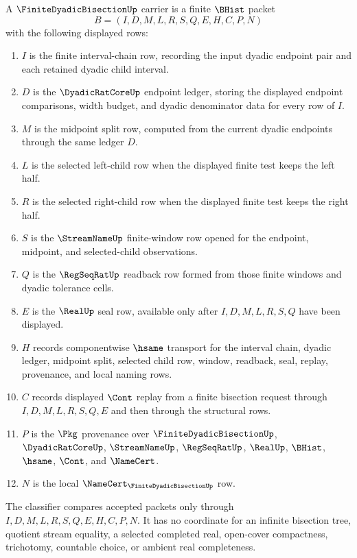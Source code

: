 \begin{definition}
\label{def:finite-dyadic-bisection-carrier}
A $\FiniteDyadicBisectionUp$ carrier is a finite $\BHist$ packet
$$
B=(I,D,M,L,R,S,Q,E,H,C,P,N)
$$
with the following displayed rows:
\begin{enumerate}
\item $I$ is the finite interval-chain row, recording the input dyadic endpoint pair and each retained dyadic child interval.
\item $D$ is the $\DyadicRatCoreUp$ endpoint ledger, storing the displayed endpoint comparisons, width budget, and dyadic denominator data for every row of $I$.
\item $M$ is the midpoint split row, computed from the current dyadic endpoints through the same ledger $D$.
\item $L$ is the selected left-child row when the displayed finite test keeps the left half.
\item $R$ is the selected right-child row when the displayed finite test keeps the right half.
\item $S$ is the $\StreamNameUp$ finite-window row opened for the endpoint, midpoint, and selected-child observations.
\item $Q$ is the $\RegSeqRatUp$ readback row formed from those finite windows and dyadic tolerance cells.
\item $E$ is the $\RealUp$ seal row, available only after $I,D,M,L,R,S,Q$ have been displayed.
\item $H$ records componentwise $\hsame$ transport for the interval chain, dyadic ledger, midpoint split, selected child row, window, readback, seal, replay, provenance, and local naming rows.
\item $C$ records displayed $\Cont$ replay from a finite bisection request through $I,D,M,L,R,S,Q,E$ and then through the structural rows.
\item $P$ is the $\Pkg$ provenance over $\FiniteDyadicBisectionUp$, $\DyadicRatCoreUp$, $\StreamNameUp$, $\RegSeqRatUp$, $\RealUp$, $\BHist$, $\hsame$, $\Cont$, and $\NameCert$.
\item $N$ is the local $\NameCert_{\FiniteDyadicBisectionUp}$ row.
\end{enumerate}
The classifier compares accepted packets only through $I,D,M,L,R,S,Q,E,H,C,P,N$. It has no coordinate for an infinite bisection tree, quotient stream equality, a selected completed real, open-cover compactness, trichotomy, countable choice, or ambient real completeness.
\end{definition}

